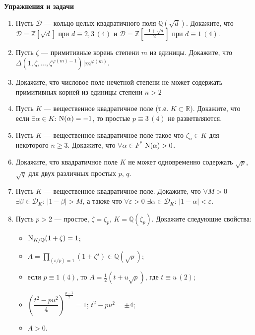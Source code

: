 \noindent\textbf{Упражнения и задачи}
\begin{enumerate}[topsep=0pt]
    \item Пусть $\mathcal{D}$ --- кольцо целых квадратичного поля $\mathbb{Q}(\sqrt{d})$. Докажите, что $\mathcal{D}=\mathbb{Z}[\sqrt{d}]$ при $d\equiv 2,3\, (4)$ и $\mathcal{D}=\mathbb{Z}\left[\frac{-1+\sqrt{d}}{2}\right]$ при $d\equiv 1\, (4)$. %
    \item Пусть $\zeta$ --- примитивные корень степени $m$ из единицы. Докажите, что \\ $\Delta(1,\zeta,\dots,\zeta^{\varphi(m)-1}) | m^{\varphi(m)}$.  %
    \item Докажите, что числовое поле нечетной степени не может содержать примитивных корней из единицы степени $n>2$ %
    \item Пусть $K$ --- вещественное квадратичное поле (т.е. $K\subset \mathbb{R}$). Докажите, что если $\exists \alpha \in K$: $\operatorname{N}(\alpha)=-1$, то простые $p\equiv 3\,(4)$ не разветвляются. %
    \item Пусть $K$ --- вещественное квадратичное поле такое что $\zeta_n\in K$ для некоторого $n\geqslant 3$. Докажите, что $\forall\alpha\in F^*$ $\operatorname{N}(\alpha) > 0$. %
    \item Докажите, что квадратичное поле $K$ не может одновременно содержать $\sqrt{p}$, $\sqrt{q}$ для двух различных простых $p$, $q$. %
    \item Пусть $K$ --- вещественное квадратичное поле. Докажите, что $\forall M > 0$ $\exists\beta\in\mathcal{D}_K$: $|1-\beta|>M$, а также что $\forall \varepsilon > 0$ $\exists\alpha\in\mathcal{D}_K$: $|1-\alpha|<\varepsilon$. %
    \item Пусть $p>2$ --- простое, $\zeta=\zeta_p$, $K=\mathbb{Q}(\zeta_p)$. Докажите следующие свойства:
    \begin{itemize}[topsep=0pt,noitemsep]
        \item $\operatorname{N}_{K/\mathbb{Q}}(1+\zeta)=1$;
        \item $A=\prod_{(s/p)=1} (1+\zeta^s)\in\mathbb{Q}(\sqrt{p})$;
        \item если $p\equiv 1\, (4)$, то $A=\frac{1}{2}(t+u\sqrt{p})$, где $t\equiv u\,(2)$;
        \item $\left(\dfrac{t^2-pu^2}{4}\right)^{\frac{p-1}{2}}=1$; $t^2-pu^2=\pm 4$;
        \item $A>0$.
    \end{itemize} %

\end{enumerate}
